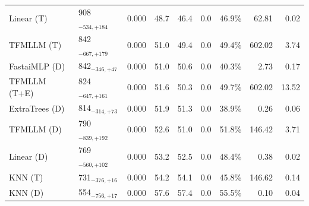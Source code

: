 \begin{tabular}{llcccccrr}
Linear (T) & 908${}_{-534,+184}$ & 0.000 & 48.7 & 46.4 & 0.0 & 46.9\% & 62.81 & 0.02 \\
TFMLLM (T) & 842${}_{-667,+179}$ & 0.000 & 51.0 & 49.4 & 0.0 & 49.4\% & 602.02 & 3.74 \\
FastaiMLP (D) & 842${}_{-346,+47}$ & 0.000 & 51.0 & 50.6 & 0.0 & 40.3\% & 2.73 & 0.17 \\
TFMLLM (T+E) & 824${}_{-647,+161}$ & 0.000 & 51.6 & 50.3 & 0.0 & 49.7\% & 602.02 & 13.52 \\
ExtraTrees (D) & 814${}_{-314,+73}$ & 0.000 & 51.9 & 51.3 & 0.0 & 38.9\% & 0.26 & 0.06 \\
TFMLLM (D) & 790${}_{-839,+192}$ & 0.000 & 52.6 & 51.0 & 0.0 & 51.8\% & 146.42 & 3.71 \\
Linear (D) & 769${}_{-560,+102}$ & 0.000 & 53.2 & 52.5 & 0.0 & 48.4\% & 0.38 & 0.02 \\
KNN (T) & 731${}_{-376,+16}$ & 0.000 & 54.2 & 54.1 & 0.0 & 45.8\% & 146.62 & 0.14 \\
KNN (D) & 554${}_{-756,+17}$ & 0.000 & 57.6 & 57.4 & 0.0 & 55.5\% & 0.10 & 0.04 \\
\bottomrule
\end{tabular}